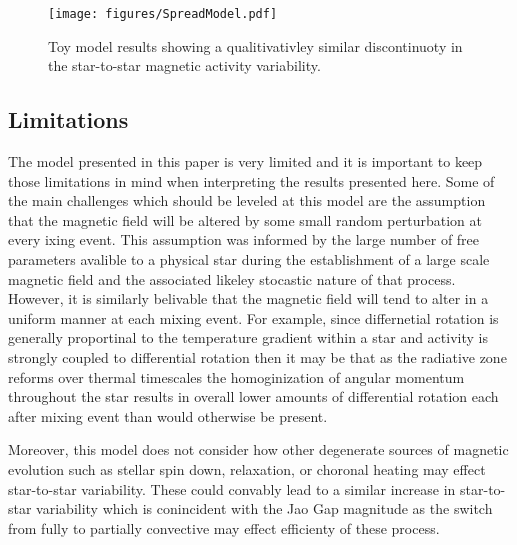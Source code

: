 \begin{figure}
  \centering
  \texttt{[image: figures/SpreadModel.pdf]}
  \caption{Toy model results showing a qualitivativley similar discontinuoty in the star-to-star magnetic activity variability.}
  \label{fig:model}
\end{figure}

\subsection{Limitations}
The model presented in this paper is very limited and it is important to keep
those limitations in mind when interpreting the results presented here. Some of
the main challenges which should be leveled at this model are the assumption
that the magnetic field will be altered by some small random perturbation at
every ixing event. This assumption was informed by the large number of free
parameters avalible to a physical star during the establishment of a large scale 
magnetic field and the associated likeley stocastic nature of that process.
However, it is similarly belivable that the magnetic field will tend to alter in
a uniform manner at each mixing event. For example, since differnetial rotation
is generally proportinal to the temperature gradient within a star and activity is
strongly coupled to differential rotation then it may be that as the radiative zone reforms over thermal timescales the homoginization of angular momentum throughout the star results in overall lower amounts of differential rotation each after mixing event than would otherwise be present.

Moreover, this model does not consider how other degenerate sources of magnetic evolution such as stellar spin down, relaxation, or choronal heating may effect star-to-star variability. These could convably lead to a similar increase in star-to-star variability which is conincident with the Jao Gap magnitude as the switch from fully to partially convective may effect efficienty of these process.

